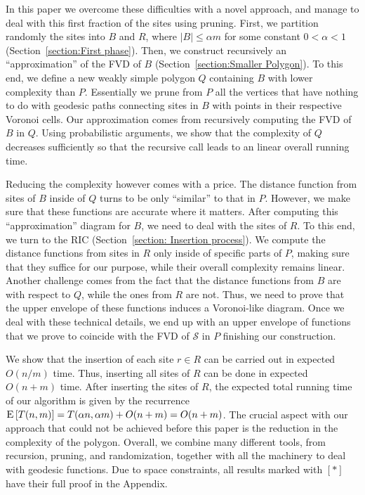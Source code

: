 \documentclass[a4paper,UKenglish]{socg-lipics-v2018}
\newcommand{\s}{\mathcal S}
\newcommand{\ex}[1]{\textsc{E}\left[#1\right]}
\begin{document}
In this paper we overcome these difficulties with a novel approach, and manage to deal with this first fraction of the sites using pruning.
First, we partition randomly the sites into $B$ and $R$, where $|B| \leq \alpha m$ for some constant $0 < \alpha < 1$ (Section~\ref{section:First phase}).
Then, we construct recursively an ``approximation'' of the FVD of $B$ (Section~\ref{section:Smaller Polygon}). 
To this end, we define a new weakly simple polygon $Q$ containing $B$ with lower complexity than $P$. 
Essentially we prune from $P$ all the vertices that have nothing to do with geodesic paths connecting sites in $B$ with points in their respective Voronoi cells. 
Our approximation comes from recursively computing the FVD of $B$ in $Q$. 
Using probabilistic arguments, we show that the complexity of $Q$ decreases sufficiently so that the recursive call leads to an linear overall running time.

Reducing the complexity however comes with a price. The distance function from sites  of $B$ inside of $Q$ turns to be only ``similar'' to that in $P$.
However, we make sure that these functions are accurate where it matters. 
After computing this ``approximation'' diagram for $B$, we need to deal with the sites of $R$. 
To this end, we turn to the RIC (Section~\ref{section: Insertion process}).
We compute the distance functions from sites in $R$ only inside of specific parts of $P$, making sure that they suffice for our purpose, while their overall complexity remains linear.
Another challenge comes from the fact that the distance functions from $B$ are with respect to $Q$, while the ones from $R$ are not.
Thus, we need to prove that the upper envelope of these functions induces a Voronoi-like diagram.
Once we deal with these technical details, we end up with an upper envelope of functions that we prove to coincide with the FVD of $\s$ in $P$ finishing our construction. 

We show that the insertion of each site $r\in R$ can be carried out in expected $O(n/m)$ time.  
Thus, inserting all sites of $R$ can be done in expected $O(n+ m)$ time.
After inserting the sites of $R$, the expected total running time of our algorithm is given by the recurrence $\ex{T(n, m)} = T(\alpha n, \alpha m) + O(n+m) = O(n+ m)$. 
The crucial aspect with our approach that could not be achieved before this paper is the reduction in the complexity of the polygon. 
Overall, we combine many different tools, from recursion, pruning, and randomization, together with all the machinery to deal with geodesic functions. 
Due to space constraints, all results marked with $[*]$ have their full proof in the Appendix. 
\end{document}
